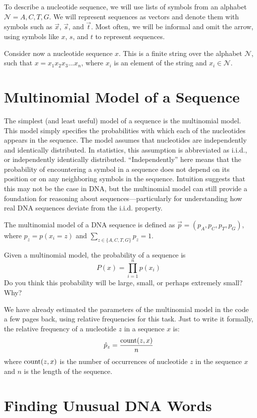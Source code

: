 To describe a nucleotide sequence, we will use lists of symbols from an alphabet $\mathcal{N} = {A, C, T, G}$. We will represent sequences as vectors and denote them with symbols such as $\vec{x}$, $\vec{s}$, and $\vec{t}$. Most often, we will be informal and omit the arrow, using symbols like $x$, $s$, and $t$ to represent sequences.

Consider now a nucleotide sequence $x$. This is a finite string over the alphabet $\mathcal{N}$, such that $x = x_1x_2x_3 \dots x_n$, where $x_i$ is an element of the string and $x_i \in \mathcal{N}$.

\section*{Multinomial Model of a Sequence}

The simplest (and least useful) model of a sequence is the multinomial model. This model simply specifies the probabilities with which each of the nucleotides appears in the sequence. The model assumes that nucleotides are independently and identically distributed. In statistics, this assumption is abbreviated as i.i.d., or independently identically distributed. ``Independently'' here means that the probability of encountering a symbol in a sequence does not depend on its position or on any neighboring symbols in the sequence. Intuition suggests that this may not be the case in DNA, but the multinomial model can still provide a foundation for reasoning about sequences—particularly for understanding how real DNA sequences deviate from the i.i.d. property.

The multinomial model of a DNA sequence is defined as $\vec{p} = (p_A, p_C, p_T, p_G)$, where $p_z = p(x_i = z)$ and $\sum_{z \in \{A, C, T, G\}} p_z = 1$.

Given a multinomial model, the probability of a sequence is
\[
P(x) = \prod_{i=1}^{n} p(x_i)
\]
Do you think this probability will be large, small, or perhaps extremely small? Why?

We have already estimated the parameters of the multinomial model in the code a few pages back, using relative frequencies for this task. Just to write it formally, the relative frequency of a nucleotide $z$ in a sequence $x$ is:
\[
\hat{p}_z = \frac{{\rm count}(z, x)}{n}
\]
where ${\rm count}(z, x)$ is the number of occurrences of nucleotide $z$ in the sequence $x$ and $n$ is the length of the sequence.

\section*{Finding Unusual DNA Words}

